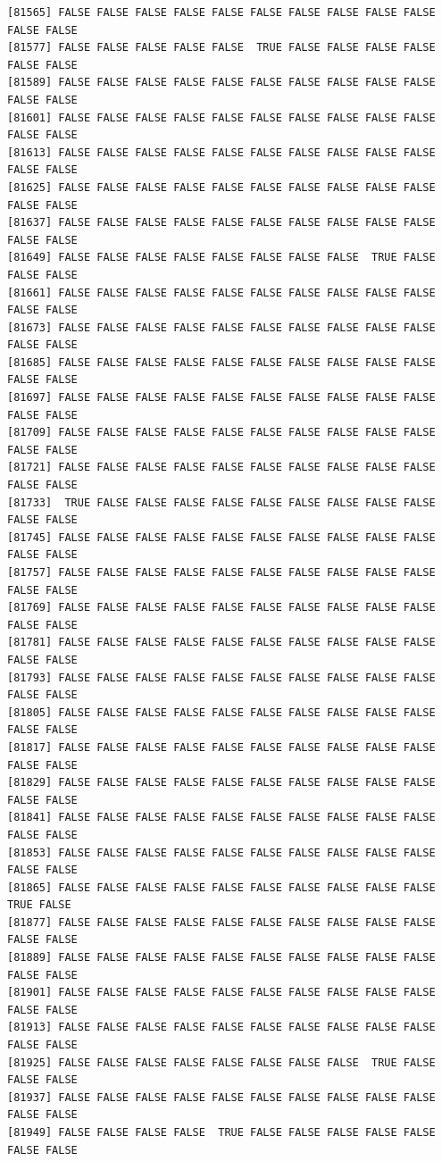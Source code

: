 \documentclass[
  a4paper,
  DIV=11,
  numbers=noendperiod]{scrartcl}
\begin{document}
\begin{verbatim}
[81565] FALSE FALSE FALSE FALSE FALSE FALSE FALSE FALSE FALSE FALSE FALSE FALSE
[81577] FALSE FALSE FALSE FALSE FALSE  TRUE FALSE FALSE FALSE FALSE FALSE FALSE
[81589] FALSE FALSE FALSE FALSE FALSE FALSE FALSE FALSE FALSE FALSE FALSE FALSE
[81601] FALSE FALSE FALSE FALSE FALSE FALSE FALSE FALSE FALSE FALSE FALSE FALSE
[81613] FALSE FALSE FALSE FALSE FALSE FALSE FALSE FALSE FALSE FALSE FALSE FALSE
[81625] FALSE FALSE FALSE FALSE FALSE FALSE FALSE FALSE FALSE FALSE FALSE FALSE
[81637] FALSE FALSE FALSE FALSE FALSE FALSE FALSE FALSE FALSE FALSE FALSE FALSE
[81649] FALSE FALSE FALSE FALSE FALSE FALSE FALSE FALSE  TRUE FALSE FALSE FALSE
[81661] FALSE FALSE FALSE FALSE FALSE FALSE FALSE FALSE FALSE FALSE FALSE FALSE
[81673] FALSE FALSE FALSE FALSE FALSE FALSE FALSE FALSE FALSE FALSE FALSE FALSE
[81685] FALSE FALSE FALSE FALSE FALSE FALSE FALSE FALSE FALSE FALSE FALSE FALSE
[81697] FALSE FALSE FALSE FALSE FALSE FALSE FALSE FALSE FALSE FALSE FALSE FALSE
[81709] FALSE FALSE FALSE FALSE FALSE FALSE FALSE FALSE FALSE FALSE FALSE FALSE
[81721] FALSE FALSE FALSE FALSE FALSE FALSE FALSE FALSE FALSE FALSE FALSE FALSE
[81733]  TRUE FALSE FALSE FALSE FALSE FALSE FALSE FALSE FALSE FALSE FALSE FALSE
[81745] FALSE FALSE FALSE FALSE FALSE FALSE FALSE FALSE FALSE FALSE FALSE FALSE
[81757] FALSE FALSE FALSE FALSE FALSE FALSE FALSE FALSE FALSE FALSE FALSE FALSE
[81769] FALSE FALSE FALSE FALSE FALSE FALSE FALSE FALSE FALSE FALSE FALSE FALSE
[81781] FALSE FALSE FALSE FALSE FALSE FALSE FALSE FALSE FALSE FALSE FALSE FALSE
[81793] FALSE FALSE FALSE FALSE FALSE FALSE FALSE FALSE FALSE FALSE FALSE FALSE
[81805] FALSE FALSE FALSE FALSE FALSE FALSE FALSE FALSE FALSE FALSE FALSE FALSE
[81817] FALSE FALSE FALSE FALSE FALSE FALSE FALSE FALSE FALSE FALSE FALSE FALSE
[81829] FALSE FALSE FALSE FALSE FALSE FALSE FALSE FALSE FALSE FALSE FALSE FALSE
[81841] FALSE FALSE FALSE FALSE FALSE FALSE FALSE FALSE FALSE FALSE FALSE FALSE
[81853] FALSE FALSE FALSE FALSE FALSE FALSE FALSE FALSE FALSE FALSE FALSE FALSE
[81865] FALSE FALSE FALSE FALSE FALSE FALSE FALSE FALSE FALSE FALSE  TRUE FALSE
[81877] FALSE FALSE FALSE FALSE FALSE FALSE FALSE FALSE FALSE FALSE FALSE FALSE
[81889] FALSE FALSE FALSE FALSE FALSE FALSE FALSE FALSE FALSE FALSE FALSE FALSE
[81901] FALSE FALSE FALSE FALSE FALSE FALSE FALSE FALSE FALSE FALSE FALSE FALSE
[81913] FALSE FALSE FALSE FALSE FALSE FALSE FALSE FALSE FALSE FALSE FALSE FALSE
[81925] FALSE FALSE FALSE FALSE FALSE FALSE FALSE FALSE  TRUE FALSE FALSE FALSE
[81937] FALSE FALSE FALSE FALSE FALSE FALSE FALSE FALSE FALSE FALSE FALSE FALSE
[81949] FALSE FALSE FALSE FALSE  TRUE FALSE FALSE FALSE FALSE FALSE FALSE FALSE

\end{verbatim}
\end{document}
